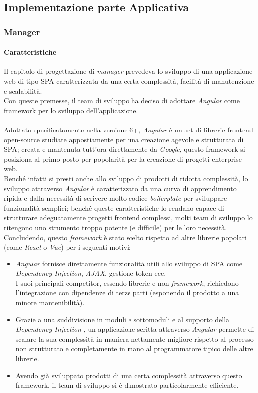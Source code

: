 \documentclass[12pt]{article}
\begin{document}
\subsection{Implementazione parte Applicativa}
\subsubsection{Manager}
\paragraph{Caratteristiche}
Il capitolo di progettazione di \textit{manager} prevedeva lo sviluppo di una applicazione web di tipo SPA caratterizzata da una certa complessità, facilità di manutenzione e scalabilità.\\
Con queste premesse, il team di sviluppo ha deciso di adottare \textit{Angular} come framework per lo sviluppo dell'applicazione.\\\\
Adottato specificatamente nella versione 6+, \textit{Angular} è un set di librerie frontend open-source studiate appostiamente per una creazione agevole e strutturata di SPA; creata e mantenuta tutt'ora direttamente da \textit{Google}, questo framework si posiziona al primo posto per popolarità per la creazione di progetti enterprise web.\\
Benché infatti si presti anche allo sviluppo di prodotti di ridotta complessità, lo sviluppo attraverso \textit{Angular} è caratterizzato da una curva di apprendimento ripida e dalla necessità di scrivere molto codice \textit{boilerplate} per sviluppare funzionalità semplici; benché queste caratteristiche lo rendano capace di strutturare adeguatamente progetti frontend complessi, molti team di sviluppo lo ritengono uno strumento troppo potente (e difficile) per le loro necessità.\\
Concludendo, questo \textit{framework} è stato scelto rispetto ad altre librerie popolari (come \textit{React} o \textit{Vue}) per i seguenti motivi:
\begin{itemize}
\item \textit{Angular} fornisce direttamente funzionalità utili allo sviluppo di SPA come \textit{Dependency Injection}, \textit{AJAX}, gestione token ecc.\\
I suoi principali competitor, essendo librerie e non \textit{framework}, richiedono l'integrazione con dipendenze di terze parti (esponendo il prodotto a una minore mantenibilità).
\item Grazie a una suddivisione in moduli e sottomoduli e al supporto della \textit{Dependency Injection
}, un applicazione scritta attraverso \textit{Angular} permette di scalare la sua complessità in maniera nettamente migliore rispetto al processo non strutturato e completamente in mano al programmatore tipico delle altre librerie.
\item Avendo già sviluppato prodotti di una certa complessità attraverso questo framework, il team di sviluppo si è dimostrato particolarmente efficiente.
\end{itemize}
\end{document}
